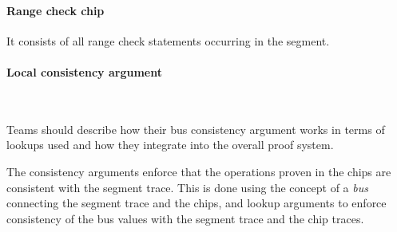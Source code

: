 \paragraph{Range check chip}
It consists of all range check statements occurring in the segment.

\paragraph{Local consistency argument}$\phantom{=}$

\begin{instruction}
  Teams should describe how their bus consistency argument works in terms of lookups used and how they integrate into the overall proof system.
\end{instruction}

The consistency arguments enforce that the operations proven in the chips are consistent
with the segment trace. This is done using the concept of a \emph{bus} connecting the segment trace and the chips,
and lookup arguments to enforce consistency of the bus values with the segment trace and the chip traces.

